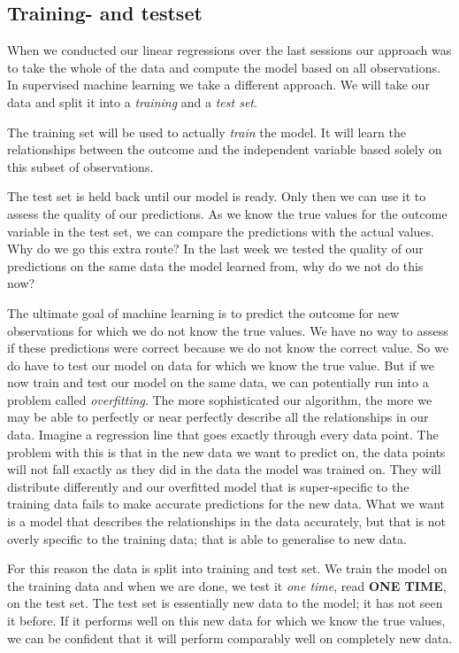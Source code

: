 \documentclass[
]{book}
\begin{document}
\hypertarget{training--and-testset}{%
\subsection{Training- and testset}\label{training--and-testset}}

When we conducted our linear regressions over the last sessions our approach was
to take the whole of the data and compute the model based on all observations.
In supervised machine learning we take a different approach.
We will take our data and split it into a \emph{training} and a \emph{test set}.

The training set will be used to actually \emph{train} the model. It will learn the
relationships between the outcome and the independent variable based solely on
this subset of observations.

The test set is held back until our model is ready. Only then we can use it to
assess the quality of our predictions. As we know the true values for the
outcome variable in the test set, we can compare the predictions with the
actual values. Why do we go this extra route? In the last week we tested the
quality of our predictions on the same data the model learned from, why do we
not do this now?

The ultimate goal of machine learning is to predict the outcome for new
observations for which we do not know the true values. We have no way to assess
if these predictions were correct because we do not know the correct value.
So we do have to test our model on data for which we know the true value.
But if we now train and test our model on the same data, we can potentially run
into a problem called \emph{overfitting}.
The more sophisticated our algorithm, the more we may be
able to perfectly or near perfectly describe all the relationships in our data.
Imagine a regression line that goes exactly through every data point. The
problem with this is that in the new data we want to predict on, the data points
will not fall exactly as they did in the data the model was trained on. They
will distribute differently and our overfitted model that is super-specific to
the training data fails to make accurate predictions for the new data. What we
want is a model that describes the relationships in the data accurately,
but that is not overly specific to the training data; that is able to generalise
to new data.

For this reason the data is split into training and test set. We train the model
on the training data and when we are done, we test it \emph{one time}, read
\textbf{ONE TIME}, on the test set.
The test set is essentially new data to the model; it has not seen it before. If
it performs well on this new data for which we know the true values, we can be
confident that it will perform comparably well on completely new data.
\end{document}
